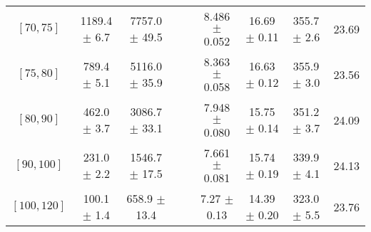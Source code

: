 \begin{tabular}{c||c|c|c|c|c|c|c||c}
$[70, 75]$ & 1189.4 $\pm$ 6.7 & 7757.0 $\pm$ 49.5 &  &  & 8.486 $\pm$ 0.052 & 16.69 $\pm$ 0.11 & 355.7 $\pm$ 2.6 & 23.69\\
$[75, 80]$ & 789.4 $\pm$ 5.1 & 5116.0 $\pm$ 35.9 &  &  & 8.363 $\pm$ 0.058 & 16.63 $\pm$ 0.12 & 355.9 $\pm$ 3.0 & 23.56\\
$[80, 90]$ & 462.0 $\pm$ 3.7 & 3086.7 $\pm$ 33.1 &  &  & 7.948 $\pm$ 0.080 & 15.75 $\pm$ 0.14 & 351.2 $\pm$ 3.7 & 24.09\\
$[90, 100]$ & 231.0 $\pm$ 2.2 & 1546.7 $\pm$ 17.5 &  &  & 7.661 $\pm$ 0.081 & 15.74 $\pm$ 0.19 & 339.9 $\pm$ 4.1 & 24.13\\
$[100, 120]$ & 100.1 $\pm$ 1.4 & 658.9 $\pm$ 13.4 &  &  & 7.27 $\pm$ 0.13 & 14.39 $\pm$ 0.20 & 323.0 $\pm$ 5.5 & 23.76\\
\end{tabular}
